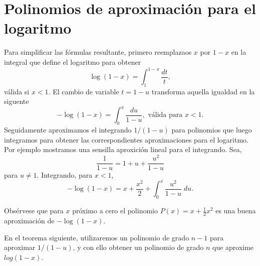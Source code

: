 \section{Polinomios de aproximación para el logaritmo}

Para simplificar las fórmulas resultante, primero reemplazaos $x$ por $1-x$ en la integral que define el logaritmo para obtener 
$$\log(1-x)=\int_{1}^{1-x}\dfrac{dt}{t},$$
válida si $x<1$. El cambio de variable $t=1-u$ transforma aquella igualdad en la siguente 
$$-\log(1-x)=\int_0^x \dfrac{du}{1-u}, \mbox{ válida para } x<1.$$
Seguidamente aproximamos el integrando $1/(1-u)$ para polinomios que luego integramos para obtener las correspondientes aproximaciones para el logaritmo.\\

Por ejemplo mostramos una sensilla aproxición lineal para el integrando. Sea,
$$\dfrac{1}{1-u}=1+u+\dfrac{u^2}{1-u}$$
para $u\neq 1$. Integrando, para $x<1$,
$$-\log(1-x)=x+\dfrac{x^2}{2}+\int_0^x \dfrac{u^2}{1-u}\; du.$$

Obsérvese que para $x$ próximo a cero el polinomio $P(x)=x+\frac{1}{2}x^2$ es una buena aproximación de $-\log(1-x)$.

\begin{center}
\end{center}

\vspace{.5cm}

En el teorema siguiente, utilizaremos un polinomio de grado $n-1$ para aproximar $1/(1-u)$, y con ello obtener un polinomio de grado $n$ que aproxime $log(1-x)$.


